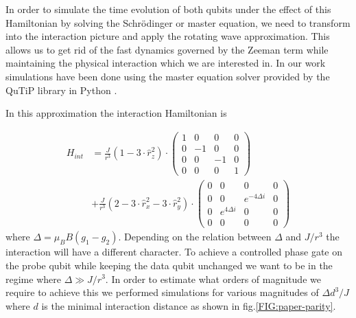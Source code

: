 In order to simulate the time evolution of both qubits under the effect of this Hamiltonian by solving the Schr\"odinger or master equation, we need to transform into the interaction picture and apply the rotating wave approximation. This allows us to get rid of the fast dynamics governed by the Zeeman term while maintaining the physical interaction which we are interested in. In our work simulations have been done using the master equation solver provided by the QuTiP library in Python \cite{Johansson2012,Johansson2013}.

In this approximation the interaction Hamiltonian is

\begin{align*}
	H_{int}&= \frac{J}{r^3} (1-3 \cdot \hat{r}_z^2) \cdot
	\begin{pmatrix}
	1 & 0 & 0 & 0 \\
	0 & -1 & 0 & 0 \\
	0 & 0 & -1 & 0 \\
	0 & 0 & 0 & 1 
	\end{pmatrix} \\
	&+ \frac{J}{r^3} (2-3 \cdot \hat{r}_x^2 -3 \cdot \hat{r}_y^2) \cdot
	\begin{pmatrix}
	0 & 0 & 0 & 0 \\
	0 & 0 & e^{-4 \Delta i} & 0 \\
	0 & e^{4 \Delta i} & 0 & 0 \\
	0 & 0 & 0 & 0 
	\end{pmatrix}
\end{align*}
where $\Delta=\mu_B B (g_1-g_2)$. Depending on the relation between $\Delta$ and $J/r^3$ the interaction will have a different character. 
To achieve a controlled phase gate on the probe qubit while keeping the data qubit unchanged we want to be in the regime where $\Delta \gg J/r^3$.
In order to estimate what orders of magnitude we require to achieve this we performed simulations for various magnitudes of $\Delta d^3/ J$ where $d$ is the minimal interaction distance as shown in fig.\@ \ref{FIG:paper-parity}.


